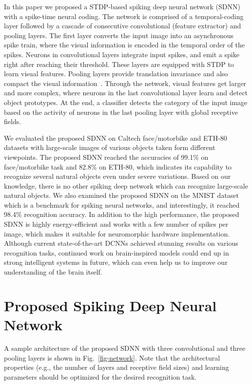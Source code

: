 \documentclass[preprint,5p,12pt,twocolumn]{article}
\begin{document}
In this paper we proposed a STDP-based spiking deep neural network (SDNN) with a spike-time neural coding. The network is comprised of a temporal-coding layer followed by a cascade of consecutive convolutional (feature extractor) and pooling layers. The first layer converts the input image into an asynchronous spike train, where the visual information is encoded in the temporal order of the spikes. Neurons in convolutional layers integrate input spikes, and emit a spike right after reaching their threshold. These layers are equipped with STDP to learn visual features. Pooling layers provide translation  invariance and also compact the visual information~\cite{Serre2007.PAMI}. Through the network, visual features get larger and more complex, where neurons in the last convolutional layer learn and detect object prototypes. At the end, a classifier detects the category of the input image based on the activity of neurons in the last pooling layer with global receptive fields.

We evaluated the proposed SDNN on Caltech face/motorbike and ETH-80 datasets with large-scale images of various objects taken form different viewpoints. The proposed SDNN reached the accuracies of 99.1\% on face/motorbike task and 82.8\% on ETH-80, which indicates its capability to recognize several natural objects even under severe variations. Based on our knowledge, there is no other spiking deep network which can recognize large-scale natural objects. We also examined the proposed SDNN on the MNIST dataset which is a benchmark for spiking neural networks, and interestingly, it reached 98.4\% recognition accuracy. In addition to the high performance, the proposed SDNN is highly energy-efficient and works with a few number of spikes per image, which makes it suitable for neuromorphic hardware implementation. Although current state-of-the-art DCNNs achieved stunning results on various recognition tasks, continued work on  brain-inspired models could end up in strong intelligent systems in future, which can even help us to improve our understanding of the brain itself.


\section*{Proposed Spiking Deep Neural Network}
A sample architecture of the proposed SDNN with three convolutional and three pooling layers is shown in Fig.~\ref{fig-network}. Note that the architectural properties (e.g., the number of layers and receptive field sizes) and learning parameters should be optimized for the desired recognition task.
\end{document}
